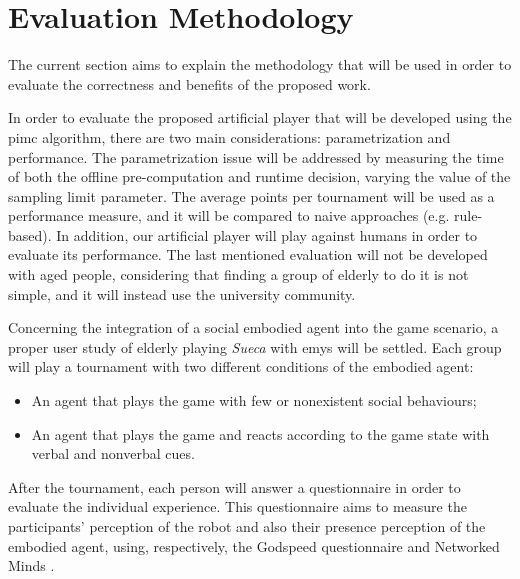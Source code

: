 \section{Evaluation Methodology} \label{sec:evaluation}

The current section aims to explain the methodology that will be used in order to evaluate the correctness and benefits of the proposed work.

In order to evaluate the proposed artificial player that will be developed using the \gls{pimc} algorithm, there are two main considerations: parametrization and performance.
The parametrization issue will be addressed by measuring the time of both the offline pre-computation and runtime decision, varying the value of the sampling limit parameter.
The average points per tournament will be used as a performance measure, and it will be compared to naive approaches (e.g. rule-based).
In addition, our artificial player will play against humans in order to evaluate its performance.
The last mentioned evaluation will not be developed with aged people, considering that finding a group of elderly to do it is not simple, and it will instead use the university community.



Concerning the integration of a social embodied agent into the game scenario, a proper user study of elderly playing \emph{Sueca} with \gls{emys} will be settled.
Each group will play a tournament with two different conditions of the embodied agent:
\begin{itemize}
\item An agent that plays the game with few or nonexistent social behaviours;
\item An agent that plays the game and reacts according to the game state with verbal and nonverbal cues.
\end{itemize}
After the tournament, each person will answer a questionnaire in order to evaluate the individual experience.
This questionnaire aims to measure the participants' perception of the robot and also their presence perception of the embodied agent, using, respectively, the Godspeed questionnaire \cite{Bartneck2008} and Networked Minds \cite{Biocca2001}.



